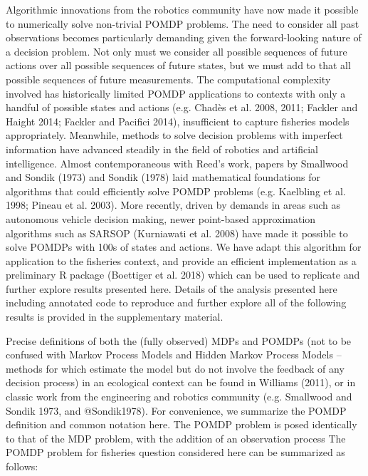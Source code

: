 \documentclass[3p]{elsarticle} %
\begin{document}
Algorithmic innovations from the robotics community have now made it
possible to numerically solve non-trivial POMDP problems. The need to
consider all past observations becomes particularly demanding given the
forward-looking nature of a decision problem. Not only must we consider
all possible sequences of future actions over all possible sequences of
future states, but we must add to that all possible sequences of future
measurements. The computational complexity involved has historically
limited POMDP applications to contexts with only a handful of possible
states and actions (e.g. Chadès et al. 2008, 2011; Fackler and Haight
2014; Fackler and Pacifici 2014), insufficient to capture fisheries
models appropriately. Meanwhile, methods to solve decision problems with
imperfect information have advanced steadily in the field of robotics
and artificial intelligence. Almost contemporaneous with Reed's work,
papers by Smallwood and Sondik (1973) and Sondik (1978) laid
mathematical foundations for algorithms that could efficiently solve
POMDP problems (e.g. Kaelbling et al. 1998; Pineau et al. 2003). More
recently, driven by demands in areas such as autonomous vehicle decision
making, newer point-based approximation algorithms such as SARSOP
(Kurniawati et al. 2008) have made it possible to solve POMDPs with 100s
of states and actions. We have adapt this algorithm for application to
the fisheries context, and provide an efficient implementation as a
preliminary R package (Boettiger et al. 2018) which can be used to
replicate and further explore results presented here. Details of the
analysis presented here including annotated code to reproduce and
further explore all of the following results is provided in the
supplementary material.

Precise definitions of both the (fully observed) MDPs and POMDPs (not to
be confused with Markov Process Models and Hidden Markov Process Models
-- methods for which estimate the model but do not involve the feedback
of any decision process) in an ecological context can be found in
Williams (2011), or in classic work from the engineering and robotics
community (e.g. Smallwood and Sondik 1973, and @Sondik1978). For
convenience, we summarize the POMDP definition and common notation here.
The POMDP problem is posed identically to that of the MDP problem, with
the addition of an observation process The POMDP problem for fisheries
question considered here can be summarized as follows:
\end{document}
